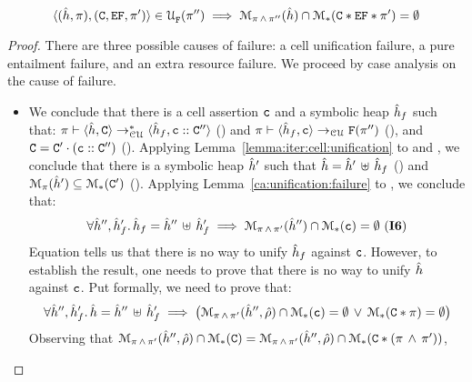 \begin{lemma}
$$
\unificationfullfail{\sheap, \pc}{\cells, \efs, \pfs'}{}{\pc''} 
%
 \implies \smodels{\sheap}{\pc \, \wedge \, \pc''} \cap \sepmodels{\cells \sep \efs \sep \pc'} = \emptyset
 $$
\end{lemma}
\begin{proof}
There are three possible causes of failure: a cell unification failure, a pure entailment failure, 
and an extra resource failure. We proceed by case analysis on the cause of failure. 
\vspace{6pt}
\begin{itemize}
    \item {} We conclude that there is a cell assertion $\cell$ 
              and a symbolic heap $\sheap_f$ such that:  
              $\cellunificationiter{\sheap, \cells}{\sheap_f, \cell \lstcons \cells''}{\pc}$ () 
              and $\cellunificationx{\sheap_f, \cell}{\uno{\pc''}}{\pc}$ (), and  
              $\cells = \cells' \lstconcat (\cell \lstcons \cells'')$ (). Applying Lemma~\ref{lemma:iter:cell:unification}
              to  and , we conclude that there is a symbolic heap $\sheap'$ such that $\sheap = \sheap' \dunion \sheap_f$ ()
              and $\smodels{\sheap'}{\pc} \subseteq \sepmodels{\cells'}$ (). 
              Applying Lemma~\ref{ca:unification:failure} to , we conclude that: 
              $$
              	\forall \sheap'', \sheap_f' . \, \sheap_f = \sheap'' \dunion \sheap_f' \implies 
                     \smodels{\sheap''}{\pc \, \wedge \, \pc'} \cap \sepmodels{\cell} = \emptyset \text{ (\ieq{6})}
              $$
              Equation  tells us that there is no way to unify $\sheap_f$ against $\cell$. However, to 
              establish the result, one needs to prove that there is no way to unify $\sheap$ against $\cell$. 
              Put formally, we need to prove that: 
              $$
              	\forall \sheap'', \sheap_f' . \, \sheap = \sheap'' \dunion \sheap_f' \implies 
                     \big(\smodels{\sheap'', \sstore}{\pc \, \wedge \, \pc'} \cap \sepmodels{\cell} = \emptyset 
                     	\, \vee \, 
	              \sepmodels{\cells \sep \pc} = \emptyset \big)
              $$
              Observing that 
              $\smodels{\sheap'', \sstore}{\pc \, \wedge \, \pc'} \cap \sepmodels{\cells}  =   
                  \smodels{\sheap'', \sstore}{\pc \, \wedge \, \pc'} \cap \sepmodels{\cells \sep (\pc \, \wedge \, \pc')}$, 

\end{itemize}
\end{proof}
